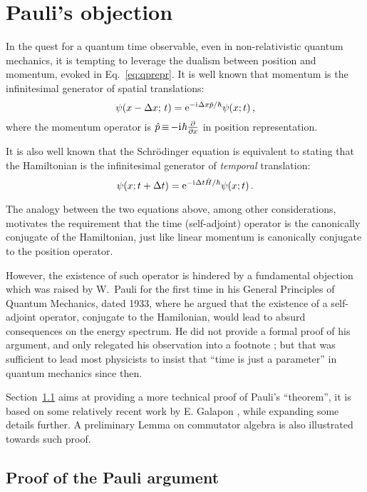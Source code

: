 \section{Pauli's objection}\label{proof}

In the quest for a quantum time observable,
even in non-relativistic quantum mechanics,
it is tempting to leverage
the dualism between position and momentum,
evoked in Eq.~\eqref{eq:qprepr}.
It is well known that momentum is the infinitesimal generator of spatial translations:
\begin{equation}
  \psi(x-\Delta x; \, t) = \mathrm{e}^{-\mathrm{i}\mkern1mu \Delta x \hat{p} / \hbar} \psi(x; t) \,\text{,}
\end{equation}
where the momentum operator is $\hat{p} \operatorname*{\equiv} -\mathrm{i}\mkern1mu\hbar \pdv{x}$ in position representation.

It is also well known that the Schr\"odinger equation is equivalent to
stating that the Hamiltonian is the infinitesimal generator of
\emph{temporal} translation:
\begin{equation}
  \psi(x; t+\Delta t) = \mathrm{e}^{-\mathrm{i}\mkern1mu \Delta t \hat{H} / \hbar} \psi(x; t) \,\text{.}
\end{equation}

The analogy between the two equations above,
among other considerations,
motivates the requirement that
the time (self-adjoint) operator is the canonically conjugate of the Hamiltonian,
just like linear momentum is canonically conjugate to the position operator.

However, the existence of such operator is hindered by a fundamental objection
which was raised by W.~Pauli for the first time
in his General Principles of Quantum Mechanics, dated 1933,
where he argued that the existence of a self-adjoint operator,
conjugate to the Hamilonian,
would lead to absurd consequences on the energy spectrum.
He did not provide a formal proof of his argument,
and only relegated his observation into a footnote
\parencite{PauliFootnote}; but that was sufficient to
lead most physicists to insist that ``time is just a parameter''
in quantum mechanics
since then.

Section~\ref{sec:pauliproof} aims at providing
a more technical proof of Pauli's ``theorem'',
it is based on some relatively recent work by
E. Galapon \parencite{Galapon2002},
while expanding some details further.
A preliminary Lemma on commutator algebra is also illustrated
towards such proof.


\subsection{Proof of the Pauli argument}\label{sec:pauliproof}


